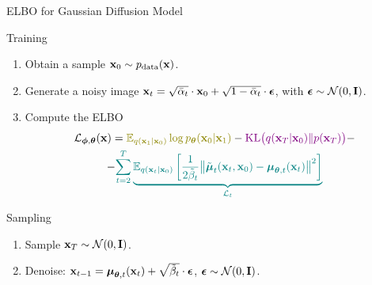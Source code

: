 \documentclass{beamer}
\begin{document}
\begin{frame}{ELBO for Gaussian Diffusion Model}
    \begin{block}{Training}
        \begin{enumerate}
            \item Obtain a sample $\mathbf{x}_0 \sim p_{\text{data}}(\mathbf{x})$.
            \item Generate a noisy image $\mathbf{x}_t = \sqrt{\bar{\alpha}_t} \cdot \mathbf{x}_0 + \sqrt{1 - \bar{\alpha}_t} \cdot \boldsymbol{\epsilon}$, with $\boldsymbol{\epsilon} \sim \mathcal{N}(0, \mathbf{I})$.
            \item Compute the ELBO
            \vspace{-0.3cm}
            \begin{multline*}
                \cL_{\bphi, \btheta}(\bx) =  {\color{olive}\bbE_{q(\bx_1 | \bx_0)} \log \pt(\bx_0 | \bx_1)} - {\color{violet}\KL\bigl(q(\bx_T | \bx_0) \| p(\bx_T)\bigr)} - \\
                - {\color{teal}\sum_{t=2}^T \underbrace{ \bbE_{q(\bx_t | \bx_0)} \left[\frac{1}{2\tilde{\beta}_t} \bigl\| \tilde{\bmu}_t(\bx_t, \bx_0) - \bmu_{\btheta, t}(\bx_t) \bigr\|^2  \right]}_{\cL_t}}
            \end{multline*}
            \vspace{-0.7cm}
        \end{enumerate}
    \end{block}
    \eqpause
    \begin{block}{Sampling}
        \begin{enumerate}
            \item Sample $\mathbf{x}_T \sim \mathcal{N}(0, \mathbf{I})$.
            \item Denoise: $\mathbf{x}_{t - 1} = \boldsymbol{\mu}_{\boldsymbol{\theta}, t}(\mathbf{x}_t) +  \sqrt{\tilde{\beta}_t} \cdot \boldsymbol{\epsilon}$, $\boldsymbol{\epsilon} \sim \mathcal{N}(0, \mathbf{I})$.
        \end{enumerate}
    \end{block}
\end{frame}
\end{document}
